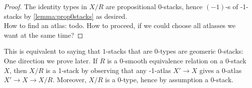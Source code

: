 \begin{proof}
	The identity types in $X / R$ are propositional  0-stacks, hence $(-1)$-\truncation s of  -1-stacks by \ref{lemma:prop0stacks} as desired. \\
	How to find an atlas: todo. How to proceed, if we could choose all atlasses we want at the same time?
	
	
\end{proof}
\begin{rmk}
	This is equivalent to saying that  $1$-stacks that are $0$-types are geomeric $0$-stacks: One direction we prove later. If $R$ is a 0-smooth equivalence relation on a  0-stack $X$, then $ X/ R$ is a  1-stack by observing that any -1-atlas $X' \to X$ gives a 0-atlas $X' \to X \to X/ R$. Moreover, $ X/ R$ is a 0-type, hence by assumption a  0-stack.
\end{rmk}

